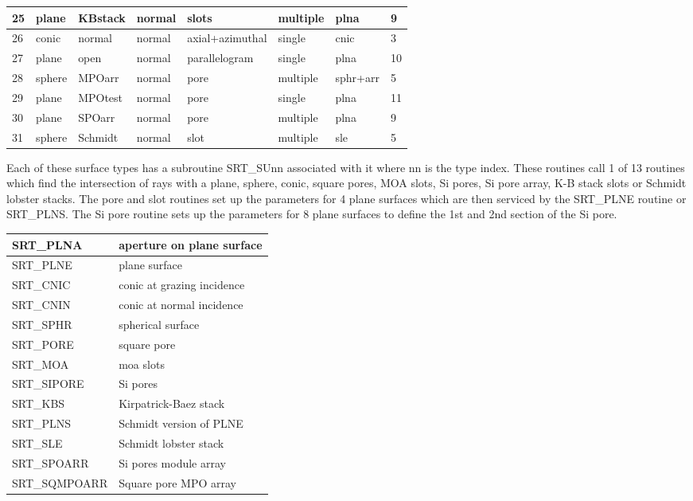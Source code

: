 \documentclass[letterpaper,10pt,english]{sphinxmanual}
\begin{document}
\begin{savenotes}
\begin{longtable}{|l|l|l|l|l|l|l|l|}
\hline
25
&
plane
&
KBstack
&
normal
&
slots
&
multiple
&
plna
&
9
\\
\hline
26
&
conic
&
normal
&
normal
&
axial+azimuthal
&
single
&
cnic
&
3
\\
\hline
27
&
plane
&
open
&
normal
&
parallelogram
&
single
&
plna
&
10
\\
\hline
28
&
sphere
&
MPOarr
&
normal
&
pore
&
multiple
&
sphr+arr
&
5
\\
\hline
29
&
plane
&
MPOtest
&
normal
&
pore
&
single
&
plna
&
11
\\
\hline
30
&
plane
&
SPOarr
&
normal
&
pore
&
multiple
&
plna
&
9
\\
\hline
31
&
sphere
&
Schmidt
&
normal
&
slot
&
multiple
&
sle
&
5
\\
\hline
\end{longtable}\sphinxatlongtableend\end{savenotes}

Each of these surface types has a subroutine SRT\_SUnn associated with
it where nn is the type index. These routines call 1 of 13 routines which
find the intersection of rays with a plane, sphere, conic, square pores,
MOA slots, Si pores, Si pore array, K-B stack slots or Schmidt lobster stacks.
The pore and slot routines set up the parameters for 4 plane surfaces
which are then serviced by the SRT\_PLNE routine or SRT\_PLNS.
The Si pore routine
sets up the parameters for 8 plane surfaces to define the 1st and
2nd section of the Si pore.


\begin{savenotes}\sphinxattablestart
\centering
\begin{tabulary}{\linewidth}[t]{|T|T|}
\hline

SRT\_PLNA
&
aperture on plane surface
\\
\hline
SRT\_PLNE
&
plane surface
\\
\hline
SRT\_CNIC
&
conic at grazing incidence
\\
\hline
SRT\_CNIN
&
conic at normal incidence
\\
\hline
SRT\_SPHR
&
spherical surface
\\
\hline
SRT\_PORE
&
square pore
\\
\hline
SRT\_MOA
&
moa slots
\\
\hline
SRT\_SIPORE
&
Si pores
\\
\hline
SRT\_KBS
&
Kirpatrick-Baez stack
\\
\hline
SRT\_PLNS
&
Schmidt version of PLNE
\\
\hline
SRT\_SLE
&
Schmidt lobster stack
\\
\hline
SRT\_SPOARR
&
Si pores module array
\\
\hline
SRT\_SQMPOARR
&
Square pore MPO array
\\
\hline
\end{tabulary}
\par
\sphinxattableend\end{savenotes}
\end{document}

